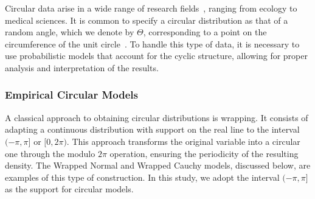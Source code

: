 \documentclass[remotesensing,article,submit,pdftex,moreauthors]{Definitions/mdpi}
\begin{document}
Circular data arise in a wide range of research fields~\cite{OneDirection?ATutorialforCircularDataAnalysisUsingRWithExamplesinCognitivePsychology}, ranging from ecology to medical sciences. 
It is common to specify a circular distribution as that of a random angle, which we denote by $\Theta$, corresponding to a point on the circumference of the unit circle~\cite{CircularStatisticsinR}. 
To handle this type of data, it is necessary to use probabilistic models that account for the cyclic structure, allowing for proper analysis and interpretation of the results.

\subsubsection{Empirical Circular Models}\label{subsec:circulars_models}


A classical approach to obtaining circular distributions is wrapping.
It consists of adapting a continuous distribution with support on the real line to the interval $(-\pi, \pi]$ or $[0, 2\pi)$. 
This approach transforms the original variable into a circular one through the modulo $2\pi$ operation, ensuring the periodicity of the resulting density. 
The Wrapped Normal and Wrapped Cauchy models, discussed below, are examples of this type of construction. 
In this study, we adopt the interval $(-\pi, \pi]$ as the support for circular models. 

\end{document}
